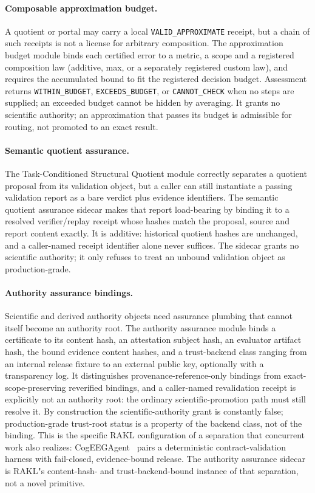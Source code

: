 \paragraph{Composable approximation budget.}
A quotient or portal may carry a local \texttt{VALID\_\allowbreak APPROXIMATE} receipt, but a chain of such receipts is not a license for arbitrary composition. The approximation budget module binds each certified error to a metric, a scope and a registered composition law (additive, max, or a separately registered custom law), and requires the accumulated bound to fit the registered decision budget. Assessment returns \texttt{WITHIN\_\allowbreak BUDGET}, \texttt{EXCEEDS\_\allowbreak BUDGET}, or \texttt{CANNOT\_CHECK} when no steps are supplied; an exceeded budget cannot be hidden by averaging. It grants no scientific authority; an approximation that passes its budget is admissible for routing, not promoted to an exact result.

\paragraph{Semantic quotient assurance.}
The Task-Conditioned Structural Quotient module correctly separates a quotient proposal from its validation object, but a caller can still instantiate a passing validation report as a bare verdict plus evidence identifiers. The semantic quotient assurance sidecar makes that report load-bearing by binding it to a resolved verifier/replay receipt whose hashes match the proposal, source and report content exactly. It is additive: historical quotient hashes are unchanged, and a caller-named receipt identifier alone never suffices. The sidecar grants no scientific authority; it only refuses to treat an unbound validation object as production-grade.

\paragraph{Authority assurance bindings.}
Scientific and derived authority objects need assurance plumbing that cannot itself become an authority root. The authority assurance module binds a certificate to its content hash, an attestation subject hash, an evaluator artifact hash, the bound evidence content hashes, and a trust-backend class ranging from an internal release fixture to an external public key, optionally with a transparency log. It distinguishes provenance-reference-only bindings from exact-scope-preserving reverified bindings, and a caller-named revalidation receipt is explicitly not an authority root: the ordinary scientific-promotion path must still resolve it. By construction the scientific-authority grant is constantly false; production-grade trust-root status is a property of the backend class, not of the binding. This is the specific RAKL configuration of a separation that concurrent work also realizes: CogEEGAgent~\cite{hou2026cogeegagent} pairs a deterministic contract-validation harness with fail-closed, evidence-bound release. The authority assurance sidecar is RAKL"s content-hash- and trust-backend-bound instance of that separation, not a novel primitive.

